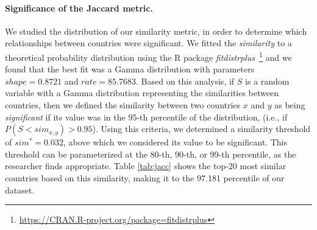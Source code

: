 %
\paragraph{Significance of the Jaccard metric.}
%
We studied the distribution of our similarity metric, in order to determine
which relationships between countries were significant. 
%
We fitted the \emph{similarity} to a theoretical probability distribution using
the R package {\em
fitdistrplus}~\footnote{\url{https://CRAN.R-project.org/package=fitdistrplus}}
and we found that the best fit was a Gamma distribution with parameters
$shape=0.8721$ and $rate=85.7683$.
%
Based on this analysis, if $S$ is a random variable with a Gamma distribution
representing the similarities between countries, then we defined the similarity
between two countries $x$ and $y$ as being {\em significant} if its value was in
the 95-th percentile of the distribution, (i.e., if $P( S < sim_{x,y} ) >
0.95$).
%
Using this criteria, we determined a similarity threshold of $sim^*=0.032$,
above which we considered its value to be significant. 
%
This threshold can be parameterized at the 80-th, 90-th, or 99-th percentile, as
the researcher finds appropriate.  
%
Table \ref{tab:jacc} shows the top-20 most similar countries based on this
similarity, making it to the 97.181 percentile of our dataset. \\

